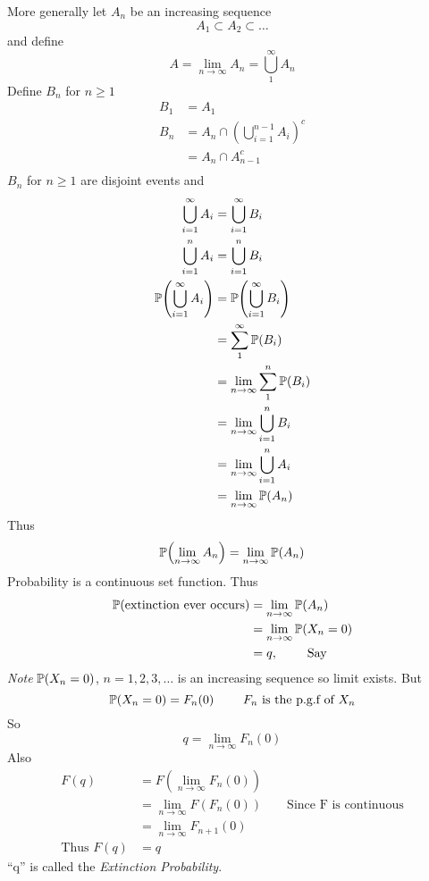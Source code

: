 \documentclass{notes}
\theoremstyle{plain}
\newcommand{\bP}{\mathbb{P}}
\newcommand{\prob}[1]{\bP \negthinspace\left(#1\right)}
\begin{document}
More generally let $A_n$ be an increasing sequence
\[
A_1 \subset A_2 \subset \dots 
\]
and define
\[
A= \lim_{n\to\infty}A_n = \bigcup_{1}^{\infty}A_n
\]
Define $B_n$ for $n \geq 1$
\begin{align*}
B_1 &= A_1\\
B_n &= A_n\cap\left(\bigcup_{i=1}^{n-1}A_i \right)^c\\
&= A_n \cap A_{n-1}^c\\
\end{align*}
$B_n$ for $n \geq 1$ are disjoint events and
\begin{align*}
\bigcup_{i=1}^{\infty}A_i &=\bigcup_{i=1}^{\infty}B_i\\
\bigcup_{i=1}^{n}A_i &=\bigcup_{i=1}^{n}B_i\\
\prob{\bigcup_{i=1}^{\infty}A_i}  &=\prob{\bigcup_{i=1}^{\infty}B_i}\\
&= \sum_{1}^\infty\prob{B_i}\\
&=\lim_{n\to\infty}\sum_1^n\prob{B_i}\\
&=\lim_{n\to\infty}\bigcup_{i=1}^{n}B_i\\
&=\lim_{n\to\infty}\bigcup_{i=1}^{n}A_i\\
&=\lim_{n\to\infty}\prob{A_n}
\end{align*}
Thus
\[
\prob{\lim_{n\to\infty}A_n} = \lim_{n\to\infty}\prob{A_n}
\]
Probability is a continuous set function.
 Thus
\begin{align*}
\prob{\text{extinction ever occurs}} &=  \lim_{n\to\infty}\prob{A_n}\\
&=\lim_{n\to\infty}\prob{X_n = 0}\\
&=q,\qquad \text{ Say}
\end{align*}
\emph{Note} $\prob{X_n = 0}$, $n=1,2,3,\dots$ is an increasing sequence
so limit exists. But
\[
\prob{X_n = 0} = F_n(0) \qquad \text{ $F_n$ is the p.g.f of $X_n$}
\]
So
\[
q = \lim_{n\to\infty}F_n(0)
\]
Also
\begin{align*}
F(q) &= F\left( \lim_{n\to\infty}F_n(0) \right)\\
&= \lim_{n\to\infty}F\left(F_n(0)\right) \qquad \text{Since F is
  continuous}\\
&=\lim_{n\to\infty}F_{n+1}(0)\\
\text{Thus } F(q) & = q  
\end{align*}
``q'' is called the \emph{Extinction Probability}.
\end{document}
